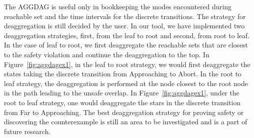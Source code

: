 The AGGDAG is useful only in bookkeeping the modes encountered during reachable set and the time intervals for the discrete transitions. The strategy for deaggregation is still decided by the user. In our tool, we have implemented two deaggregation strategies, first, from the leaf to root and second, from root to leaf. In the case of leaf to root, we first deaggregate the reachable sets that are closest to the safety violation and continue the deaggregation to the top. In Figure~\ref{fig:aggdagex1}, in the leaf to root strategy, we would first deaggregate the states taking the discrete transition from Approaching to Abort. In the root to leaf strategy, the deaggregation is performed at the node closest to the root node in the path leading to the unsafe overlap. In Figure~\ref{fig:aggdagex1}, under the root to leaf strategy, one would deaggregate the stars in the discrete transition from Far to Approaching. The best deaggregation strategy for proving safety or discovering the counterexample is still an area to be investigated and is a part of future research.






